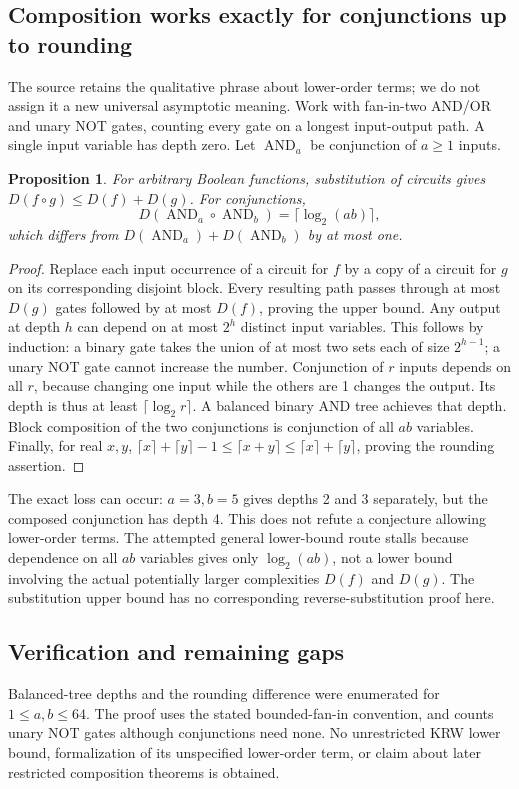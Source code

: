 \documentclass[11pt]{article}
\newtheorem{proposition}{Proposition}
\begin{document}
\subsection{Composition works exactly for conjunctions up to rounding}
The source retains the qualitative phrase about lower-order terms; we do not assign it a new universal asymptotic meaning. Work with fan-in-two AND/OR and unary NOT gates, counting every gate on a longest input-output path. A single input variable has depth zero. Let $\operatorname{AND}_a$ be conjunction of $a\ge1$ inputs.
\begin{proposition}
For arbitrary Boolean functions, substitution of circuits gives $D(f\circ g)\le D(f)+D(g)$. For conjunctions,
\[
D(\operatorname{AND}_a\circ\operatorname{AND}_b)=\lceil\log_2(ab)\rceil,
\]
which differs from $D(\operatorname{AND}_a)+D(\operatorname{AND}_b)$ by at most one.
\end{proposition}
\begin{proof}
Replace each input occurrence of a circuit for $f$ by a copy of a circuit for $g$ on its corresponding disjoint block. Every resulting path passes through at most $D(g)$ gates followed by at most $D(f)$, proving the upper bound.
Any output at depth $h$ can depend on at most $2^h$ distinct input variables. This follows by induction: a binary gate takes the union of at most two sets each of size $2^{h-1}$; a unary NOT gate cannot increase the number. Conjunction of $r$ inputs depends on all $r$, because changing one input while the others are 1 changes the output. Its depth is thus at least $\lceil\log_2 r\rceil$. A balanced binary AND tree achieves that depth. Block composition of the two conjunctions is conjunction of all $ab$ variables. Finally, for real $x,y$, $\lceil x\rceil+\lceil y\rceil-1\le\lceil x+y\rceil\le\lceil x\rceil+\lceil y\rceil$, proving the rounding assertion.
\end{proof}
The exact loss can occur: $a=3,b=5$ gives depths 2 and 3 separately, but the composed conjunction has depth 4. This does not refute a conjecture allowing lower-order terms. The attempted general lower-bound route stalls because dependence on all $ab$ variables gives only $\log_2(ab)$, not a lower bound involving the actual potentially larger complexities $D(f)$ and $D(g)$. The substitution upper bound has no corresponding reverse-substitution proof here.
\subsection{Verification and remaining gaps}
Balanced-tree depths and the rounding difference were enumerated for $1\le a,b\le64$. The proof uses the stated bounded-fan-in convention, and counts unary NOT gates although conjunctions need none. No unrestricted KRW lower bound, formalization of its unspecified lower-order term, or claim about later restricted composition theorems is obtained.
\end{document}
